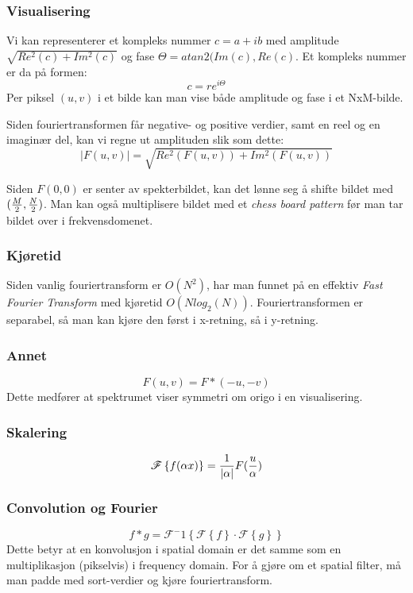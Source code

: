 \subsubsection{Visualisering}
Vi kan representerer et kompleks nummer $c = a+ib$ med amplitude $\sqrt{Re^2(c)+Im^2(c)}$ og fase $\Theta = atan2(Im(c), Re(c)$. Et kompleks nummer er da på formen:
\begin{equation}
    c = r e^{i\Theta}
\end{equation}
Per piksel $(u,v)$ i et bilde kan man vise både amplitude og fase i et NxM-bilde.

Siden fouriertransformen får negative- og positive verdier, samt en reel og en imaginær del, kan vi regne ut amplituden slik som dette:
\begin{equation}
    |F(u,v)| = \sqrt{Re^2(F(u,v)) + Im^2(F(u,v))}
\end{equation}

Siden $F(0,0)$ er senter av spekterbildet, kan det lønne seg å shifte bildet med $({M \over 2},{N \over 2})$. Man kan også multiplisere bildet med et \emph{chess board pattern} før man tar bildet over i frekvensdomenet. 

\subsubsection{Kjøretid}
Siden vanlig fouriertransform er $O(N^2)$, har man funnet på en effektiv \emph{Fast Fourier Transform} med kjøretid $O(N log_2(N))$. Fouriertransformen er separabel, så man kan kjøre den først i x-retning, så i y-retning.

\subsubsection{Annet}
\begin{equation}
    F(u,v) = F*(-u, -v)
\end{equation}
Dette medfører at spektrumet viser symmetri om origo i en visualisering.

\subsubsection{Skalering}
\begin{equation}
    \mathscr{F} \left\{f(\alpha x)\right\} = {1 \over |\alpha|}F({u \over \alpha})
\end{equation}


\subsubsection{Convolution og Fourier}
\begin{equation}
    f \ast g = \mathscr{F}^-1 \left\{\mathscr{F}\left\{f\right\} \cdot \mathscr{F}\left\{g\right\}\right\}
\end{equation}
Dette betyr at en konvolusjon i spatial domain er det samme som en multiplikasjon (pikselvis) i frequency domain. For å gjøre om et spatial filter, må man padde med sort-verdier og kjøre fouriertransform.

